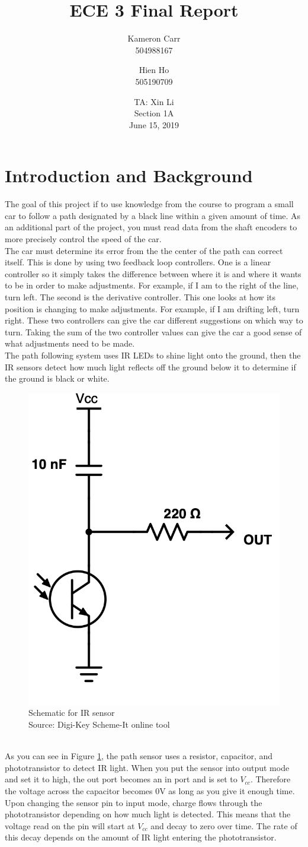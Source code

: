 \documentclass[12pt]{article}
\title{ECE 3 Final Report}
\author{Kameron Carr \\ 504988167 \and Hien Ho \\ 505190709}
\date{TA: Xin Li \\ Section 1A \\ June 15, 2019}
\begin{document}
\maketitle

\section{Introduction and Background}
The goal of this project if to use knowledge from the course to program a small car to follow a path designated by a black line within a given amount of time. As an additional part of the project, you must read data from the shaft encoders to more precisely control the speed of the car.
\\ 
The car must determine its error from the the center of the path can correct itself. This is done by using two feedback loop controllers. One is a linear controller so it simply takes the difference between where it is and where it wants to be in order to make adjustments. For example, if I am to the right of the line, turn left. The second is the derivative controller. This one looks at how its position is changing to make adjustments. For example, if I am drifting left, turn right. These two controllers can give the car different suggestions on which way to turn. Taking the sum of the two controller values can give the car a good sense of what adjustments need to be made.
\\ 
The path following system uses IR LEDs to shine light onto the ground, then the IR sensors detect how much light reflects off the ground below it to determine if the ground is black or white.
\begin{figure}[h]
  \begin{center}
  \includegraphics[width=0.2\linewidth]{IR-Sensor.png}
  \caption{Schematic for IR sensor \\ Source: Digi-Key Scheme-It online tool}
  \label{fig:sensor}
  \end{center}
\end{figure}
\\ 
As you can see in Figure \ref{fig:sensor}, the path sensor uses a resistor, capacitor, and phototransistor to detect IR light. When you put the sensor into output mode and set it to high, the out port becomes an in port and is set to $V_{cc}$. Therefore the voltage across the capacitor becomes 0V as long as you give it enough time. Upon changing the sensor pin to input mode, charge flows through the phototransistor depending on how much light is detected. This means that the voltage read on the pin will start at $V_{cc}$ and decay to zero over time. The rate of this decay depends on the amount of IR light entering the phototransistor.
\end{document}
